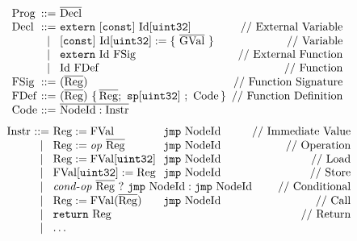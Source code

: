 \begin{figure}[t]
\[
\begin{array}{@{}l@{~}c@{~}l@{~~}lr@{}}
\rtlProg &::=& \overline{\rtlDecl}
\\
\rtlDecl &::=& 
\multicolumn{2}{@{}l@{}}{\rtlextern~\consthide{[\rtlconst]~}\typhide{\typhide{\mathit{Typ}~}}\rtlId[\usize]} &\text{// External Variable} \\
&|&\multicolumn{2}{@{}l@{}}{\consthide{[\rtlconst]~}\typhide{\mathit{Typ}~}\rtlId[\usize] := \{~\overline{\rtlGVal}~\}} & \text{// Variable}\\
&|&\multicolumn{2}{@{}l@{}}{\rtlextern~\typhide{\mathit{Typ}~}\rtlId~\rtlFSig} & \text{// External Function}\\
&|&\multicolumn{2}{@{}l@{}}{\typhide{\mathit{Typ}~}\rtlId~\rtlFunc} & \text{// Function}
\\
\rtlFSig &::=& 
\multicolumn{2}{@{}l@{}}{(\overline{\typhide{\mathit{Typ}~}\rtlReg})}
&\text{// Function Signature}
\\
\rtlFunc &::=& 
\multicolumn{2}{@{}l@{}}{(\overline{\typhide{\mathit{Typ}~}\rtlReg})~
\setof{\overline{\typhide{\mathit{Typ}~}\rtlReg};~\rtlsp[\usize]~;~\rtlCode}}
&\text{// Function Definition}
\\
\typhide{\mathit{Typ} &::=& \mathtt{int}~|~\mathtt{float}~|~\ldots\\}
\rtlCode &::=& \overline{\rtlNId:\rtlInstr}\\
\end{array}
\]
\vspace{-2ex}
\[
\begin{array}{@{}l@{~}c@{~}l@{~~}l@{}r@{}}
\rtlInstr &::=& \rtlReg := \rtlFVal&\rtljmp~\rtlNId&\text{// Immediate Value}
\\&|&\rtlReg := \rtlop~\overline{\rtlReg}&\rtljmp~\rtlNId&\text{// Operation}
\\&|&\rtlReg :=\rtlFVal[\usize]&\rtljmp~\rtlNId&\text{// Load}
\\&|&\rtlFVal[\usize] :=\rtlReg&\rtljmp~\rtlNId&\text{// Store}
\\&|&\multicolumn{2}{@{}l@{}}{\rtlcondop~\overline{\rtlReg}~?~\rtljmp~\rtlNId:\rtljmp~\rtlNId}&\text{// Conditional}
\\&|& \rtlReg := \rtlFVal(\overline{\rtlReg})&\rtljmp~\rtlNId&\text{// Call}
\\&|&\multicolumn{2}{@{}l@{}}{\rtlreturn~\rtlReg} &\text{// Return}
\\&|&\ldots\\
\end{array}
\]
\end{figure}

